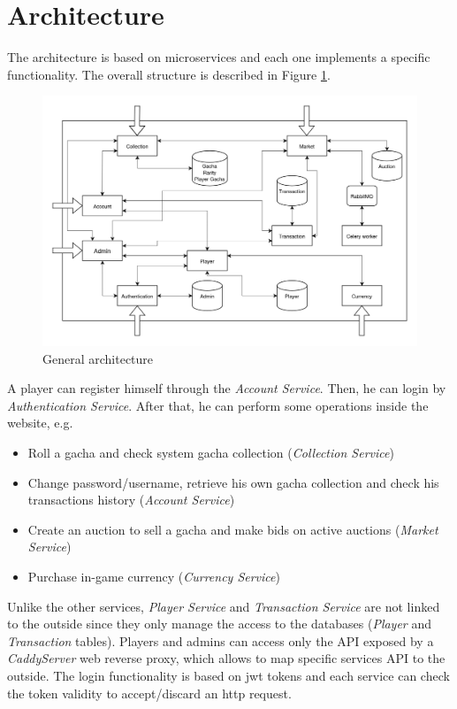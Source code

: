 \documentclass{article}
\begin{document}
\section{Architecture}
The architecture is based on microservices and each one implements a specific functionality. The overall structure is described in Figure \ref{fig:general_architecture}.
\begin{figure}[ht]
    \centering
    \includegraphics[width=12cm]{architecture/architecture-v2.png}
    \caption{General architecture}
    \label{fig:general_architecture}
\end{figure}

A player can register himself through the \emph{Account Service}. Then, he can login by \emph{Authentication Service}. After that, he can perform some operations inside the website, e.g.
\begin{itemize}
    \item Roll a gacha and check system gacha collection (\emph{Collection Service})
    \item Change password/username, retrieve his own gacha collection and check his transactions history (\emph{Account Service})
    \item Create an auction to sell a gacha and make bids on active auctions (\emph{Market Service})
    \item Purchase in-game currency (\emph{Currency Service})
\end{itemize}
Unlike the other services, \emph{Player Service} and \emph{Transaction Service} are not linked to the outside since they only manage the access to the databases (\emph{Player} and \emph{Transaction} tables). Players and admins can access only the API exposed by a \emph{CaddyServer} web reverse proxy, which allows to map specific services API to the outside. The login functionality is based on jwt tokens and each service can check the token validity to accept/discard an http request.
\end{document}
